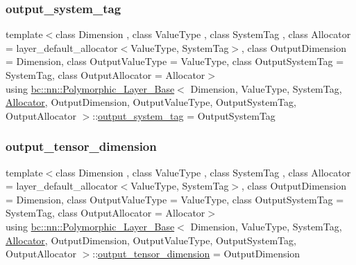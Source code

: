 \subsubsection{\texorpdfstring{output\+\_\+system\+\_\+tag}{output\_system\_tag}\hspace{0.1cm}{\footnotesize\ttfamily [2/2]}}
{\footnotesize\ttfamily template$<$class Dimension , class Value\+Type , class System\+Tag , class Allocator  = layer\+\_\+default\+\_\+allocator$<$\+Value\+Type, System\+Tag$>$, class Output\+Dimension  = Dimension, class Output\+Value\+Type  = Value\+Type, class Output\+System\+Tag  = System\+Tag, class Output\+Allocator  = Allocator$>$ \\
using \hyperlink{structbc_1_1nn_1_1Polymorphic__Layer__Base}{bc\+::nn\+::\+Polymorphic\+\_\+\+Layer\+\_\+\+Base}$<$ Dimension, Value\+Type, System\+Tag, \hyperlink{classbc_1_1allocators_1_1Allocator}{Allocator}, Output\+Dimension, Output\+Value\+Type, Output\+System\+Tag, Output\+Allocator $>$\+::\hyperlink{structbc_1_1nn_1_1Polymorphic__Layer__Base_aeb60d2b5eb18d542fecd5a34fc122bf0}{output\+\_\+system\+\_\+tag} =  Output\+System\+Tag}

\mbox{\label{structbc_1_1nn_1_1Polymorphic__Layer__Base_a099ec870d177606464f40dfb496d31a2}} 
\subsubsection{\texorpdfstring{output\+\_\+tensor\+\_\+dimension}{output\_tensor\_dimension}\hspace{0.1cm}{\footnotesize\ttfamily [1/2]}}
{\footnotesize\ttfamily template$<$class Dimension , class Value\+Type , class System\+Tag , class Allocator  = layer\+\_\+default\+\_\+allocator$<$\+Value\+Type, System\+Tag$>$, class Output\+Dimension  = Dimension, class Output\+Value\+Type  = Value\+Type, class Output\+System\+Tag  = System\+Tag, class Output\+Allocator  = Allocator$>$ \\
using \hyperlink{structbc_1_1nn_1_1Polymorphic__Layer__Base}{bc\+::nn\+::\+Polymorphic\+\_\+\+Layer\+\_\+\+Base}$<$ Dimension, Value\+Type, System\+Tag, \hyperlink{classbc_1_1allocators_1_1Allocator}{Allocator}, Output\+Dimension, Output\+Value\+Type, Output\+System\+Tag, Output\+Allocator $>$\+::\hyperlink{structbc_1_1nn_1_1Polymorphic__Layer__Base_a099ec870d177606464f40dfb496d31a2}{output\+\_\+tensor\+\_\+dimension} =  Output\+Dimension}


